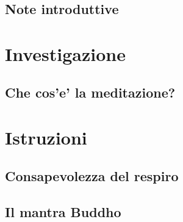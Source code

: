 \documentclass[11pt,twoside,final]{memoir}
\begin{document}

\mainmatter*


\newpage
\thispagestyle{empty}
\vspace*{8\baselineskip}
{\centering
\booktitlefont
\MakeUppercase{}\\
\MakeUppercase{}
\par
}
\vfil

\setcounter{chapter}{0}


\chapter{Note introduttive}



\part{Investigazione}

\chapter{Che cos'e' la meditazione?}



\part{Istruzioni}

\chapter{Consapevolezza del respiro}


\chapter{Il mantra Buddho}

\end{document}
